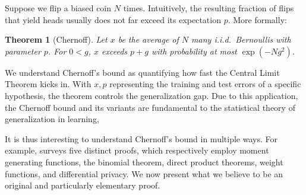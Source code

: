 \documentclass[openany, notitlepage, justified]{tufte-book}
\theoremstyle{plain}
\newtheorem{thm}{Theorem}
\theoremstyle{definition}
\begin{document}
        Suppose we flip a biased coin $N$ times.  Intuitively, the resulting
        fraction of flips that yield heads usually does not far exceed its
        expectation $p$.  More formally: 
        \begin{thm}[Chernoff]
            Let $x$ be the average of $N$ many i.i.d.\ Bernoullis with
            parameter $p$.  For $0<g$, $x$ exceeds $p+g$ with probability
            at most $\exp(-Ng^2)$.
        \end{thm}
        We understand Chernoff's bound as quantifying how fast the Central
        Limit Theorem kicks in.  With $x, p$ representing the training and test
        errors of a specific hypothesis, the theorem controls the
        generalization gap.  Due to this application, the Chernoff bound and
        its variants are fundamental to the statistical theory of
        generalization in learning,

        It is thus interesting to understand Chernoff's bound in multiple ways.
        For example, \citet{mu18} surveys five distinct proofs, which
        respectively employ
            moment generating functions,\cite[-2.8 cm]{be64}
            the binomial theorem,\cite[       -2.1 cm]{ch79}
            direct product theorems,\cite[    -1.8 cm]{im10}
            weight functions,\cite[           -0.7 cm]{mu18} and
            differential privacy.\cite[       -0   cm]{st17}
        We now present what we believe to be an original and particularly
        elementary proof.
\end{document}
